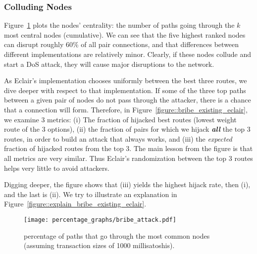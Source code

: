     
\subsubsection{Colluding Nodes}

Figure~\ref{figure::bribe_existing} plots the nodes' centrality:
the number of paths going through the $k$ most central nodes (cumulative).
We can see that the five highest ranked nodes can disrupt roughly 60\% of all pair connections, and that differences between different implementations are relatively minor. 
Clearly, 
if these nodes collude and start a 
DoS attack, they will cause major disruptions to the network.
    
As Eclair's implementation chooses uniformly between the best three routes, we dive deeper with respect to that implementation. If some of the three top paths between a given pair of nodes do not pass through the attacker, there is a chance that a connection will form.
Therefore, in Figure~\ref{figure::bribe_existing_eclair},
we examine 3 metrics: (i) The fraction of hijacked best routes (lowest weight route of the 3 options), 
(ii) the fraction of pairs for which we hijack \textbf{\emph{all}} the top 3 routes, in order to build an attack that always works,
and (iii) the \emph{expected} fraction of hijacked routes from the top 3. 
The main lesson from the figure is that all metrics are very similar. Thus Eclair's randomization between the top 3 routes helps very little to avoid attackers. 

Digging deeper, the figure shows that 
(iii) yields the highest hijack rate, then (i), and the last is (ii). We try to illustrate an explanation in Figure~\ref{figure::explain_bribe_existing_eclair}.
    
    \begin{figure} 
    	\centering
    	\texttt{[image: percentage\_graphs/bribe\_attack.pdf]}
    	\caption{percentage of paths that go through the most common nodes (assuming transaction sizes of 1000 millisatoshis).}
    	\label{figure::bribe_existing}
    \end{figure}
    
    
    
